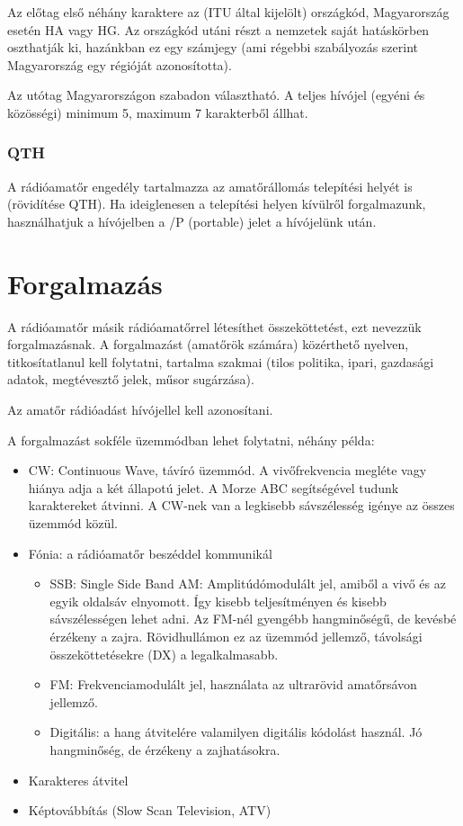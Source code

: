 \documentclass[12pt,a4paper]{article}
\begin{document}
Az előtag első néhány karaktere az (ITU által kijelölt) országkód, Magyarország esetén HA vagy HG. Az országkód utáni részt a nemzetek saját hatáskörben oszthatják ki, hazánkban ez egy számjegy (ami régebbi szabályozás szerint Magyarország egy régióját azonosította).

Az utótag Magyarországon szabadon választható. A teljes hívójel (egyéni és közösségi) minimum 5, maximum 7 karakterből állhat.

\subsubsection{QTH}

A rádióamatőr engedély tartalmazza az amatőrállomás telepítési helyét is (rövidítése QTH). Ha ideiglenesen a telepítési helyen kívülről forgalmazunk, használhatjuk a hívójelben a /P (portable) jelet a hívójelünk után.

\section{Forgalmazás}

A rádióamatőr másik rádióamatőrrel létesíthet összeköttetést, ezt nevezzük forgalmazásnak. A forgalmazást (amatőrök számára) közérthető nyelven, titkosítatlanul kell folytatni, tartalma szakmai (tilos politika, ipari, gazdasági adatok, megtévesztő jelek, műsor sugárzása).

Az amatőr rádióadást hívójellel kell azonosítani.

A forgalmazást sokféle üzemmódban lehet folytatni, néhány példa:

\begin{itemize}
\item CW: Continuous Wave, távíró üzemmód. A vivőfrekvencia megléte vagy hiánya adja a két állapotú jelet. A Morze ABC segítségével tudunk karaktereket átvinni. A CW-nek van a legkisebb sávszélesség igénye az összes üzemmód közül.
\item Fónia: a rádióamatőr beszéddel kommunikál
\begin{itemize}
\item SSB: Single Side Band AM: Amplitúdómodulált jel, amiből a vivő és az egyik oldalsáv elnyomott. Így kisebb teljesítményen és kisebb sávszélességen lehet adni. Az FM-nél gyengébb hangminőségű, de kevésbé érzékeny a zajra. Rövidhullámon ez az üzemmód jellemző, távolsági összeköttetésekre (DX) a legalkalmasabb.
\item FM: Frekvenciamodulált jel, használata az ultrarövid amatőrsávon jellemző.
\item Digitális: a hang átvitelére valamilyen digitális kódolást használ. Jó hangminőség, de érzékeny a zajhatásokra.
\end{itemize}
\item Karakteres átvitel
\item Képtovábbítás (Slow Scan Television, ATV) 
\end{itemize}
\end{document}
